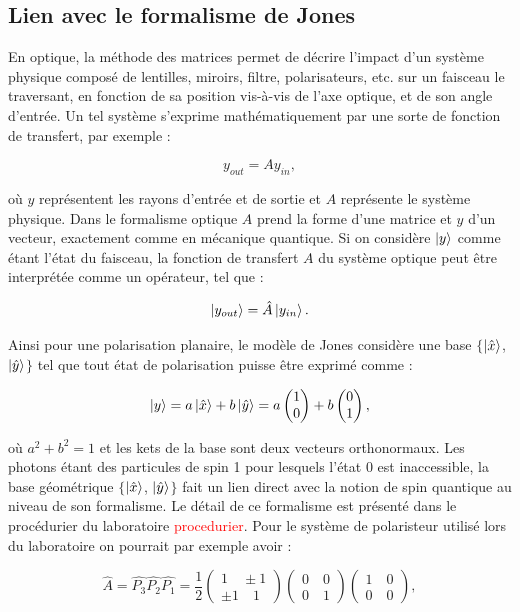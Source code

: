 \documentclass[11pt,letterpaper]{article}
\newcommand*{\Coord}[2]{%
    \begin{pmatrix} 
      #1\\ 
      #2 
    \end{pmatrix}}
\begin{document}
\subsection{Lien avec le formalisme de Jones}

En optique, la méthode des matrices permet de décrire l'impact d'un système physique composé de lentilles, miroirs, filtre, 
polarisateurs, etc. sur un faisceau le traversant, en fonction de sa position vis-à-vis de l'axe optique, et de son angle 
d'entrée. Un tel système s'exprime mathématiquement par une sorte de fonction de transfert, par exemple : 

\begin{equation}
    y_{out} = Ay_{in},
\end{equation}

où $y$  représentent les rayons d'entrée et de sortie et $A$ représente le système physique. Dans le formalisme optique $A$ 
prend la forme d'une matrice et $y$ d'un vecteur, exactement comme en mécanique quantique. Si on considère $\ket{y}$ comme 
étant l'état du faisceau, la fonction de transfert $A$ du système optique peut être interprétée comme un opérateur, tel que : 

\begin{equation}
    \ket{y_{out}} = \hat{A}\ket{y_{in}}.
\end{equation}

Ainsi pour une polarisation planaire, le modèle de Jones considère une base $\{$$\ket{\hat{x}}$, $\ket{\hat{y}}$$\}$ tel 
que tout état de polarisation puisse être exprimé comme :

\begin{equation}
    \ket{y} = a\ket{\hat{x}} + b\ket{\hat{y}} = a\Coord{1}{0} + b\Coord{0}{1},
\end{equation}

où $a^2 + b^2 = 1$ et les kets de la base sont deux vecteurs orthonormaux. Les photons étant des particules de spin 1 pour 
lesquels l'état 0 est inaccessible, la base géométrique $\{$$\ket{\hat{x}}$, $\ket{\hat{y}}$$\}$ fait un lien direct avec 
la notion de spin quantique au niveau de son formalisme. Le détail de ce formalisme est présenté dans le procédurier du 
laboratoire \textcolor{red}{procedurier}. Pour le système de polaristeur utilisé lors du laboratoire on pourrait par
exemple avoir : 

\begin{equation*}
    \hat{A} = \hat{P_3}\hat{P_2}\hat{P_1} = \frac{1}{2}\Coord{1 \quad \pm 1}{\pm 1 \quad 1}\Coord{0 \quad 0}{0 \quad 1}\Coord{1 \quad 0}{0 \quad 0},
\end{equation*}
\end{document}
